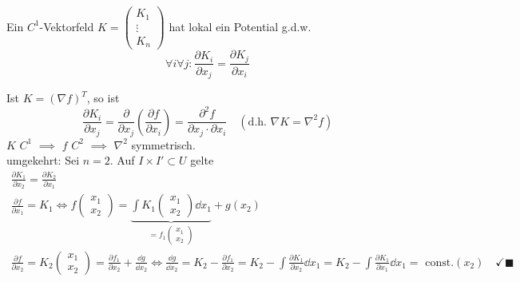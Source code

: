 \begin{satz*}
	Ein $C^1$-Vektorfeld $K = \begin{pmatrix} K_1 \\ \vdots \\ K_n \end{pmatrix}$ hat lokal ein Potential g.d.w.
	\[ \forall i \forall j : \frac{\partial K_i}{\partial x_j} = \frac{\partial K_j}{\partial x_i} \]
	\begin{bew}
		Ist $K = (\nabla f)^T$, so ist
		\[ \frac{\partial K_i}{\partial x_j} = \frac{\partial}{\partial x_j} \left( \frac{\partial f}{\partial x_i} \right) = \frac{\partial^2 f}{\partial x_j \cdot \partial x_i} \quad (\text{d.h. } \nabla K = \nabla^2 f) \]
		$K$ $C^1$ $\implies$ $f$ $C^2$ $\implies$ $\nabla^2$ symmetrisch. \\
		umgekehrt: Sei $n=2$. Auf $I \times I' \subset U$ gelte
		\begin{gather*}
			\frac{\partial K_1}{\partial x_2} = \frac{\partial K_2}{\partial x_1} \\
			\frac{\partial f}{\partial x_1} = K_1 \iff f\begin{pmatrix} x_1 \\ x_2 \end{pmatrix} = \underbrace{\int K_1\begin{pmatrix} x_1 \\ x_2 \end{pmatrix} \dd x_1}_{=f_1\begin{pmatrix} x_1 \\ x_2 \end{pmatrix}} + g(x_2) \\
			\frac{\partial f}{\partial x_2} = K_2\begin{pmatrix} x_1 \\ x_2 \end{pmatrix} = \frac{\partial f_1}{\partial x_2} + \frac{\dd g}{\dd x_2} \iff \frac{\dd g}{\dd x_2} = K_2 - \frac{\partial f_1}{\partial x_2} = K_2 - \int \frac{\partial K_1}{\partial x_2} \dd x_1 = K_2 - \int \frac{\partial K_1}{\partial x_1} \dd x_1 = \text{ const.}(x_2) \quad \checkmark \blacksquare
		\end{gather*}
	\end{bew}
\end{satz*}
